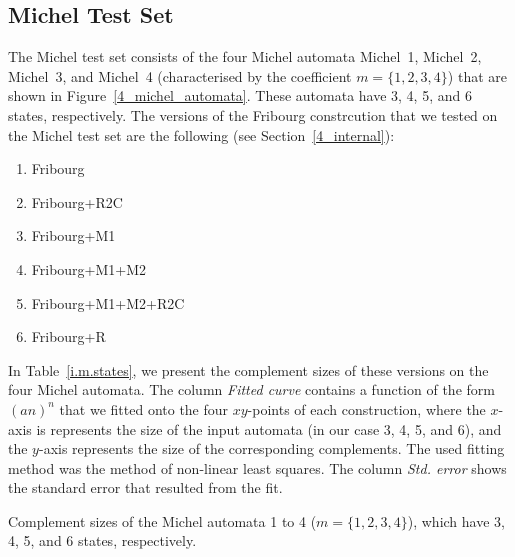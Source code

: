 


\subsection{Michel Test Set}
\label{5_internal_michel}
The Michel test set consists of the four Michel automata Michel~1, Michel~2, Michel~3, and Michel~4 (characterised by the coefficient $m=\{1,2,3,4\}$) that are shown in Figure~\ref{4_michel_automata}. These automata have 3, 4, 5, and 6 states, respectively. The versions of the Fribourg constrcution that we tested on the Michel test set are the following (see Section~\ref{4_internal}):

\begin{enumerate}
\item Fribourg
\item Fribourg+R2C
\item Fribourg+M1
\item Fribourg+M1+M2
\item Fribourg+M1+M2+R2C
\item Fribourg+R
\end{enumerate}

In Table~\ref{i.m.states}, we present the complement sizes of these versions on the four Michel automata. The column \textit{Fitted curve} contains a function of the form $(an)^n$ that we fitted onto the four $xy$-points of each construction, where the $x$-axis is represents the size of the input automata (in our case 3, 4, 5, and 6), and the $y$-axis represents the size of the corresponding complements. The used fitting method was the method of non-linear least squares. The column \textit{Std. error} shows the standard error that resulted from the fit.

\begin{table}[htb]
\centering

\caption{Complement sizes of the Michel automata 1 to 4 ($m=\{1,2,3,4\}$), which have 3, 4, 5, and 6 states, respectively. }
\label{i.m.states}
\end{table}

